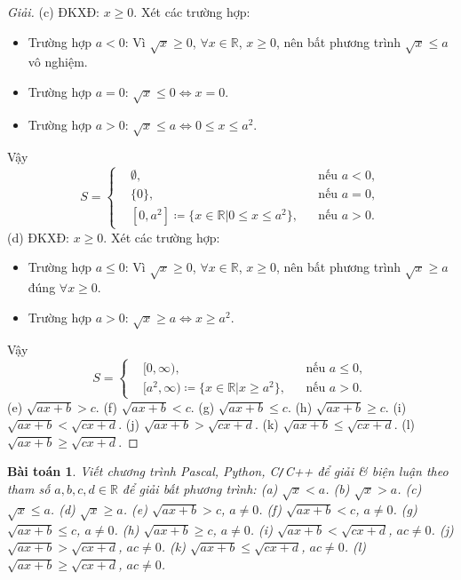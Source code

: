 \documentclass{article}
\newtheorem{baitoan}{Bài toán}
\begin{document}
\begin{proof}[Giải]
	(c) ĐKXĐ: $x\ge0$. Xét các trường hợp:
	\begin{itemize}
		\item Trường hợp $a < 0$: Vì $\sqrt{x}\ge0$, $\forall x\in\mathbb{R}$, $x\ge 0$, nên bất phương trình $\sqrt{x}\le a$ vô nghiệm.
		\item Trường hợp $a = 0$: $\sqrt{x}\le0\Leftrightarrow x = 0$.
		\item Trường hợp $a > 0$: $\sqrt{x}\le a\Leftrightarrow0\le x\le a^2$.
	\end{itemize}
	Vậy
	\begin{equation*}
		S = \left\{\begin{split}
			&\emptyset,&&\mbox{nếu } a < 0,\\
			&\{0\},&&\mbox{nếu } a = 0,\\
			&[0,a^2]\coloneqq\{x\in\mathbb{R}|0\le x\le a^2\},&&\mbox{nếu } a > 0.
		\end{split}\right.
	\end{equation*}
	(d) ĐKXĐ: $x\ge0$. Xét các trường hợp:
	\begin{itemize}
		\item Trường hợp $a\le0$: Vì $\sqrt{x}\ge0$, $\forall x\in\mathbb{R}$, $x\ge 0$, nên bất phương trình $\sqrt{x}\ge a$ đúng $\forall x\ge0$.
		\item Trường hợp $a > 0$: $\sqrt{x}\ge a\Leftrightarrow x\ge a^2$.
	\end{itemize}
	Vậy
	\begin{equation*}
		S = \left\{\begin{split}
			&[0,\infty),&&\mbox{nếu } a\le0,\\
			&[a^2,\infty)\coloneqq\{x\in\mathbb{R}|x\ge a^2\},&&\mbox{nếu } a > 0.
		\end{split}\right.
	\end{equation*}
	(e) $\sqrt{ax + b} > c$. (f) $\sqrt{ax + b} < c$. (g) $\sqrt{ax + b}\le c$. (h) $\sqrt{ax + b}\ge c$. (i) $\sqrt{ax + b} < \sqrt{cx + d}$. (j) $\sqrt{ax + b} > \sqrt{cx + d}$. (k) $\sqrt{ax + b}\le\sqrt{cx + d}$. (l) $\sqrt{ax + b}\ge\sqrt{cx + d}$.
\end{proof}

\begin{baitoan}
	Viết chương trình {\sf Pascal, Python, C\texttt{/}C++} để giải \& biện luận theo tham số $a,b,c,d\in\mathbb{R}$ để giải bất phương trình: (a) $\sqrt{x} < a$. (b) $\sqrt{x} > a$. (c) $\sqrt{x}\le a$. (d) $\sqrt{x}\ge a$. (e) $\sqrt{ax + b} > c$, $a\ne0$. (f) $\sqrt{ax + b} < c$, $a\ne0$. (g) $\sqrt{ax + b}\le c$, $a\ne0$. (h) $\sqrt{ax + b}\ge c$, $a\ne0$. (i) $\sqrt{ax + b} < \sqrt{cx + d}$, $ac\ne0$. (j) $\sqrt{ax + b} > \sqrt{cx + d}$, $ac\ne0$. (k) $\sqrt{ax + b}\le\sqrt{cx + d}$, $ac\ne0$. (l) $\sqrt{ax + b}\ge\sqrt{cx + d}$, $ac\ne0$.
\end{baitoan}
\end{document}
